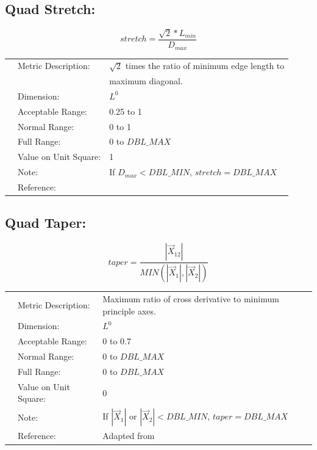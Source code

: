 \documentclass[12pt]{article}
\begin{document}
\subsection*{Quad Stretch:}


\begin{displaymath}
stretch = \frac {\sqrt{ 2 } * L_{min}} 
                { D_{max} }
\end{displaymath}

\begin{tabular}{lll}
& Metric Description:  & $\sqrt{2}$ times the ratio of minimum edge length to \\
&                      & maximum diagonal. \\ 
& Dimension:           & $L^0$                   \\ 
& Acceptable Range:    & 0.25 to 1 \\
& Normal Range:        & 0 to 1 \\ 
& Full Range:          & 0 to $DBL\_MAX$ \\ 
& Value on Unit Square:& 1 \\ 
& Note:                & If $D_{max} < DBL\_MIN$, $stretch = DBL\_MAX$  \\
& Reference:           &  \cite{two} \\
\end{tabular} 


\subsection*{Quad Taper:}

\begin{displaymath}
taper = \frac {| \vec X_{12} |} {MIN \left( | \vec X_1 |, | \vec X_2 | \right)}
\end{displaymath}

\begin{tabular}{lll}
& Metric Description:  & Maximum ratio of cross derivative to minimum principle axes. \\ 
& Dimension:           & $L^0$              \\ 
& Acceptable Range:    & 0 to 0.7               \\ 
& Normal Range:        & 0 to $DBL\_MAX$ \\ 
& Full Range:          & 0 to $DBL\_MAX$ \\ 
& Value on Unit Square:& 0 \\
& Note:                & If $|\vec X_1|$ or $|\vec X_2| < DBL\_MIN$, $taper = DBL\_MAX$  \\
& Reference:           & Adapted from \cite{one} \\
 
\end{tabular} 
\end{document}
